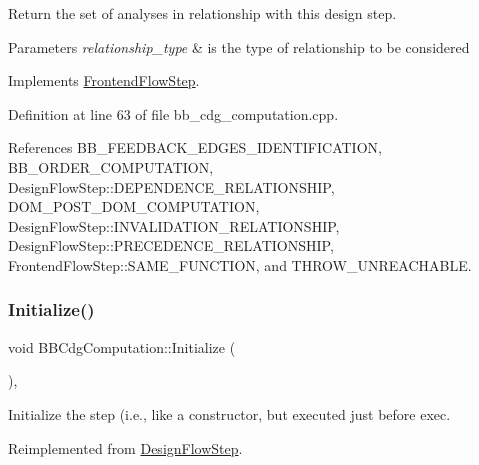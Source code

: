 Return the set of analyses in relationship with this design step. 


\begin{DoxyParams}{Parameters}
{\em relationship\+\_\+type} & is the type of relationship to be considered \\
\hline
\end{DoxyParams}


Implements \hyperlink{classFrontendFlowStep_abeaff70b59734e462d347ed343dd700d}{Frontend\+Flow\+Step}.



Definition at line 63 of file bb\+\_\+cdg\+\_\+computation.\+cpp.



References B\+B\+\_\+\+F\+E\+E\+D\+B\+A\+C\+K\+\_\+\+E\+D\+G\+E\+S\+\_\+\+I\+D\+E\+N\+T\+I\+F\+I\+C\+A\+T\+I\+ON, B\+B\+\_\+\+O\+R\+D\+E\+R\+\_\+\+C\+O\+M\+P\+U\+T\+A\+T\+I\+ON, Design\+Flow\+Step\+::\+D\+E\+P\+E\+N\+D\+E\+N\+C\+E\+\_\+\+R\+E\+L\+A\+T\+I\+O\+N\+S\+H\+IP, D\+O\+M\+\_\+\+P\+O\+S\+T\+\_\+\+D\+O\+M\+\_\+\+C\+O\+M\+P\+U\+T\+A\+T\+I\+ON, Design\+Flow\+Step\+::\+I\+N\+V\+A\+L\+I\+D\+A\+T\+I\+O\+N\+\_\+\+R\+E\+L\+A\+T\+I\+O\+N\+S\+H\+IP, Design\+Flow\+Step\+::\+P\+R\+E\+C\+E\+D\+E\+N\+C\+E\+\_\+\+R\+E\+L\+A\+T\+I\+O\+N\+S\+H\+IP, Frontend\+Flow\+Step\+::\+S\+A\+M\+E\+\_\+\+F\+U\+N\+C\+T\+I\+ON, and T\+H\+R\+O\+W\+\_\+\+U\+N\+R\+E\+A\+C\+H\+A\+B\+LE.

\mbox{\label{classBBCdgComputation_a1d510dd27e13936768f5c82a5be2494e}} 
\subsubsection{\texorpdfstring{Initialize()}{Initialize()}}
{\footnotesize\ttfamily void B\+B\+Cdg\+Computation\+::\+Initialize (\begin{DoxyParamCaption}{ }\end{DoxyParamCaption})\hspace{0.3cm}{\ttfamily [override]}, {\ttfamily [virtual]}}



Initialize the step (i.\+e., like a constructor, but executed just before exec. 



Reimplemented from \hyperlink{classDesignFlowStep_a44b50683382a094976e1d432a7784799}{Design\+Flow\+Step}.



